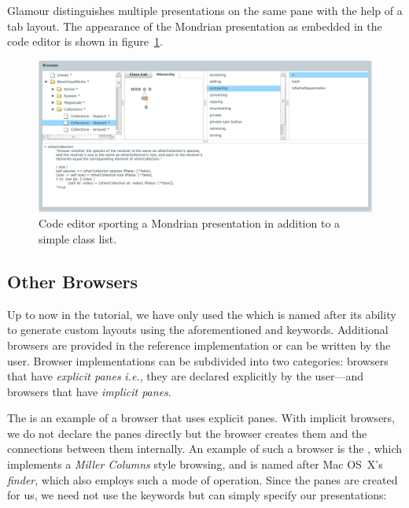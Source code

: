 \documentclass[a4paper,10pt,twoside]{book}
\begin{document}
Glamour distinguishes multiple presentations on the same pane with the help of a tab layout. The appearance of the Mondrian presentation as embedded in the code editor is shown in figure~\ref{fig:mondrian-presentation}.

\begin{figure}[htbp]
\centerline{\includegraphics[width=\linewidth]{mondrian-presentation.pdf}}
\caption{Code editor sporting a Mondrian presentation in addition to a simple class list.}
\label{fig:mondrian-presentation}
\end{figure}


\subsection{Other Browsers}

Up to now in the tutorial, we have only used the  which is named after its ability to generate custom layouts using the aforementioned  and  keywords. Additional browsers are provided in the reference implementation or can be written by the user. Browser implementations can be subdivided into two categories: browsers that have \emph{explicit panes} \emph{i.e.}, they are declared explicitly by the user---and browsers that have \emph{implicit panes}. 

The  is an example of a browser that uses
explicit panes. With implicit browsers, we do not declare the panes
directly but the browser creates them and the connections between them
internally. An example of such a browser is the , which
implements a \emph{Miller Columns} style browsing, and is named after
Mac OS~X’s \emph{finder}, which also employs such a mode of
operation. Since the panes are created for us, we need not use the
 keywords but can simply specify our presentations:
\end{document}
